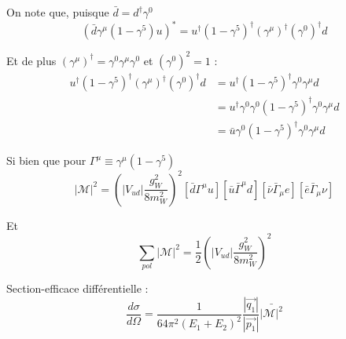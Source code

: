 \documentclass[11pt]{article} %
\begin{document}
On note que, puisque $\bar{d} = d^\dagger \gamma^0$
\begin{equation}
(\bar{d}\gamma^\mu(1-\gamma^5)u)^{*} = u^\dagger (1-\gamma^5)^{\dagger}(\gamma^\mu)^{\dagger} (\gamma^0)^\dagger d
\end{equation}

Et de plus $(\gamma^\mu)^\dagger = \gamma^0 \gamma^\mu \gamma^0$ et $(\gamma^0)^2 = 1$ :
\begin{align}
u^\dagger (1-\gamma^5)^{\dagger}(\gamma^\mu)^{\dagger} (\gamma^0)^\dagger d & = u^\dagger (1-\gamma^5)^{\dagger} \gamma^0 \gamma^\mu d\\
& = u^\dagger \gamma^0 \gamma^0 (1-\gamma^5)^{\dagger} \gamma^0 \gamma^\mu d\\
& = \bar{u} \gamma^0 (1-\gamma^5)^{\dagger} \gamma^0 \gamma^\mu d
\end{align}

Si bien que pour $\Gamma^\mu \equiv \gamma^{\mu} (1-\gamma^5)$
\begin{equation}
|\mathcal{M}|^2 = \left ( |V_{ud}|\dfrac{g_W^2}{8m_W^2} \right) ^2 [\bar{d} \Gamma^{\mu} u] [\bar{u} \bar{\Gamma}^{\mu} d] [\bar{\nu} \bar{\Gamma}_\mu e] [\bar{e} \bar{\Gamma}_\mu \nu]
\end{equation}

Et 
\begin{equation}
\sum_{pol} |\mathcal{M}|^2 = \dfrac{1}{2} \left ( |V_{ud}|\dfrac{g_W^2}{8m_W^2} \right) ^2
\end{equation}

Section-efficace différentielle :
\begin{equation}
\dfrac{d\sigma}{d\Omega} = \dfrac{1}{64\pi^2 (E_1+E_2)^2} \dfrac{|\vec{q_1}|}{|\vec{p_1}|}  \bar{|\mathcal{M}|^2}
\end{equation}
\end{document}
